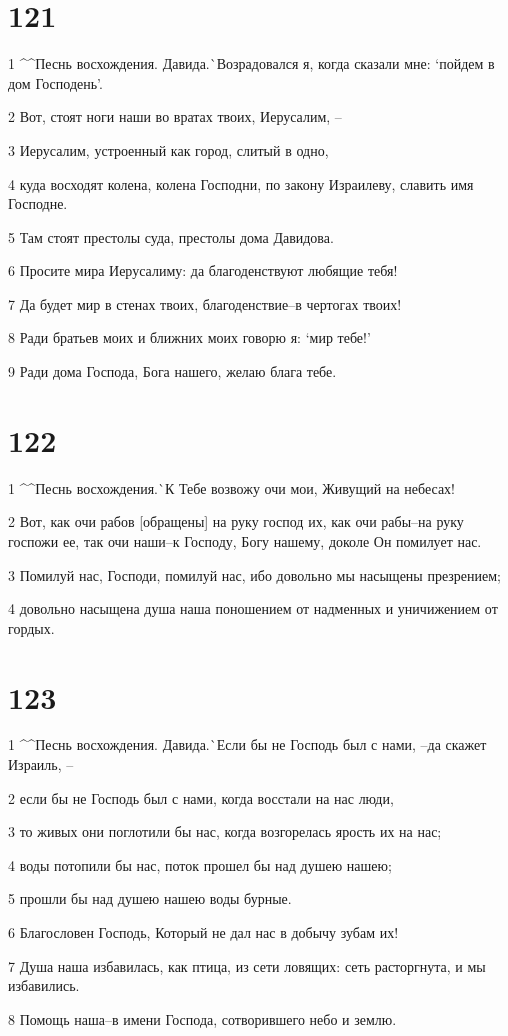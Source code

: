 \chapter{121}

\par 1 ^^Песнь восхождения. Давида.^^ Возрадовался я, когда сказали мне: `пойдем в дом Господень'.
\par 2 Вот, стоят ноги наши во вратах твоих, Иерусалим, --
\par 3 Иерусалим, устроенный как город, слитый в одно,
\par 4 куда восходят колена, колена Господни, по закону Израилеву, славить имя Господне.
\par 5 Там стоят престолы суда, престолы дома Давидова.
\par 6 Просите мира Иерусалиму: да благоденствуют любящие тебя!
\par 7 Да будет мир в стенах твоих, благоденствие--в чертогах твоих!
\par 8 Ради братьев моих и ближних моих говорю я: `мир тебе!'
\par 9 Ради дома Господа, Бога нашего, желаю блага тебе.

\chapter{122}

\par 1 ^^Песнь восхождения.^^ К Тебе возвожу очи мои, Живущий на небесах!
\par 2 Вот, как очи рабов [обращены] на руку господ их, как очи рабы--на руку госпожи ее, так очи наши--к Господу, Богу нашему, доколе Он помилует нас.
\par 3 Помилуй нас, Господи, помилуй нас, ибо довольно мы насыщены презрением;
\par 4 довольно насыщена душа наша поношением от надменных и уничижением от гордых.

\chapter{123}

\par 1 ^^Песнь восхождения. Давида.^^ Если бы не Господь был с нами, --да скажет Израиль, --
\par 2 если бы не Господь был с нами, когда восстали на нас люди,
\par 3 то живых они поглотили бы нас, когда возгорелась ярость их на нас;
\par 4 воды потопили бы нас, поток прошел бы над душею нашею;
\par 5 прошли бы над душею нашею воды бурные.
\par 6 Благословен Господь, Который не дал нас в добычу зубам их!
\par 7 Душа наша избавилась, как птица, из сети ловящих: сеть расторгнута, и мы избавились.
\par 8 Помощь наша--в имени Господа, сотворившего небо и землю.

